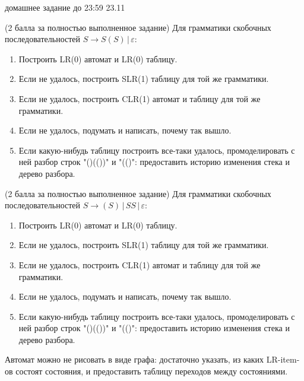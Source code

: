 \documentclass[12pt]{article}
\begin{document}

{\Large домашнее задание до 23:59 23.11}
\bigskip

\enumerate
{
  \item
  
    (2 балла за полностью выполненное задание) Для грамматики скобочных последовательностей $ S \rightarrow  S ( S ) \, | \, \varepsilon$:
    
    \begin{enumerate}
        \item Построить LR(0) автомат и LR(0) таблицу.
        \item Если не удалось, построить SLR(1) таблицу для той же грамматики.
        \item Если не удалось, построить CLR(1) автомат и таблицу для той же грамматики.
        \item Если не удалось, подумать и написать, почему так вышло. 
        \item Если какую-нибудь таблицу построить все-таки удалось, промоделировать с ней разбор строк "()(())" и "(()": предоставить историю изменения стека и дерево разбора.
    \end{enumerate} 
   \item (2 балла за полностью выполненное задание)  Для грамматики скобочных последовательностей $ S \rightarrow  ( S ) \, | \, S S  \, | \, \varepsilon$:
    
    \begin{enumerate}
        \item Построить LR(0) автомат и LR(0) таблицу.
        \item Если не удалось, построить SLR(1) таблицу для той же грамматики.
        \item Если не удалось, построить CLR(1) автомат и таблицу для той же грамматики.
        \item Если не удалось, подумать и написать, почему так вышло. 
        \item Если какую-нибудь таблицу построить все-таки удалось, промоделировать с ней разбор строк "()(())" и "(()": предоставить историю изменения стека и дерево разбора.
    \end{enumerate} 
}

  Автомат можно не рисовать в виде графа: достаточно указать, из каких LR-item-ов состоят состояния, и предоставить таблицу переходов между состояниями. 
\end{document}

